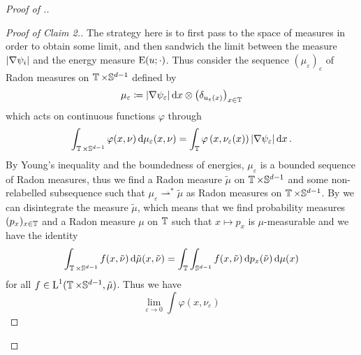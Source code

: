\begin{proof}[Proof of .]
	\begin{proof}[Proof of Claim 2.]
		The strategy here is to first pass to the space of measures in order to 
		obtain some limit, and then sandwich the limit between the measure $ 
		\abs{ \nabla \psi_{ i } } $ and the energy measure $ \operatorname{E} ( u ; 
		\cdot ) $.
		Thus consider the sequence $ ( \mu_{ \varepsilon } )_{ \varepsilon } $ 
		of 
		Radon measures on $ \operatorname{\mathbb{T}} \times \mathbb{ S }^{ d - 1 } $ defined 
		by 
		\begin{equation*}
			\mu_{ \varepsilon }
			\coloneqq
			\abs{ \nabla \psi_{ \varepsilon } } \dd{ x }
			\otimes
			\left( \delta_{ u_{ \varepsilon } ( x ) } \right)_{ x \in 
			\operatorname{\mathbb{T}} }
		\end{equation*}
		which acts on continuous functions $ \varphi $ through
		\begin{equation*}
			\int_{ \operatorname{\mathbb{T}} \times \mathbb{ S }^{ d - 1 } }
			\varphi ( x , \nu )
			\dd{ \mu_{ \varepsilon } ( x , \nu ) }
			=
			\int_{ \operatorname{\mathbb{T}} }
			\varphi \left( x , \nu_{ \varepsilon } ( x ) \right) 
			\abs{ \nabla \psi_{ \varepsilon } }
			\dd{ x }.
		\end{equation*}
		By Young's inequality and the boundedness of energies, $ \mu_{ 
			\varepsilon } $ is a bounded sequence of Radon measures, thus we 
			find a 
		Radon measure $ \tilde{ \mu } $ on $ \operatorname{\mathbb{T}} \times \mathbb{ S }^{ d 
			- 1 } $ and some non-relabelled subsequence such that $ \mu_{ 
			\varepsilon } \rightharpoonup^{ \ast } \tilde{ \mu } $ as Radon 
		measures on $ \operatorname{\mathbb{T}} \times \mathbb{ S }^{ d - 1 } $.
		By 
		\cite[Thm.~2.28]{ambrosio_fusco_pallara_functions_of_bv_and_free_discontinuity_problems}
		we can disintegrate the measure $ \tilde{ \mu } $, which means that we 
		find probability measures $ ( p_{ x } )_{ x \in \operatorname{\mathbb{T}} } $ and a 
		Radon measure $ \mu $ on $ \operatorname{\mathbb{T}} $ such that $ x \mapsto p_{ x } $ 
		is $ \mu $-measurable and we have the identity 
		\begin{equation*}
			\int_{ \operatorname{\mathbb{T}} \times \mathbb{ S }^{ d - 1 } }
			f ( x , \tilde{ \nu } )
			\dd{ \tilde{ \mu } ( x, \tilde{ \nu } ) }
			=
			\int_{ \operatorname{\mathbb{T}} }
			\int_{ \mathbb{ S }^{ d - 1 } }
			f ( x , \tilde{ \nu } )
			\dd{ p_{ x } ( \tilde{ \nu } ) }
			\dd{ \mu ( x ) }
		\end{equation*}
		for all $ f \in \operatorname{L}^{ 1 } ( \operatorname{\mathbb{T}} \times \mathbb{ S }^{ d -1 } , 
		\tilde{ \mu } ) $.
		Thus we have
		\begin{equation*}
			\lim_{ \varepsilon \to 0 }
			\int
			\varphi ( x , \nu_{ \varepsilon } ) 

\end{equation*}
\end{proof}
\end{proof}
